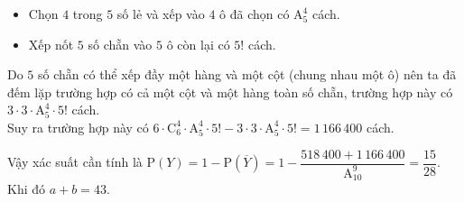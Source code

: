\begin{ex}
{\begin{itemize}
\begin{itemize}
				\item Chọn $4$ trong $5$ số lẻ và xếp vào $4$ ô đã chọn có $\mathrm{A}_5^4$ cách.
				\item Xếp nốt $5$ số chẵn vào $5$ ô còn lại có $5!$ cách.
			\end{itemize}
			Do $5$ số chẵn có thể xếp đầy một hàng và một cột (chung nhau một ô) nên ta đã đếm lặp trường hợp có cả một cột và một hàng toàn số chẵn, trường hợp này có $3 \cdot 3 \cdot \mathrm{A}_5^4 \cdot 5!$ cách.\\
			Suy ra trường hợp này có $6\cdot \mathrm{C}_6^4 \cdot \mathrm{A}_5^4\cdot 5!-3 \cdot 3\cdot \mathrm{A}_5^4 \cdot 5!=1\,166\,400$ cách.
		\end{itemize} 
		Vậy xác suất cần tính là $\mathrm{P}(Y)=1-\mathrm{P} \left(\overline{Y} \right)=1-\dfrac{518\,400+1\,166\,400}{\mathrm{A}_{10}^9}=\dfrac{15}{28}$.\\
		Khi đó $a+b=43$.
	}
\end{ex}

